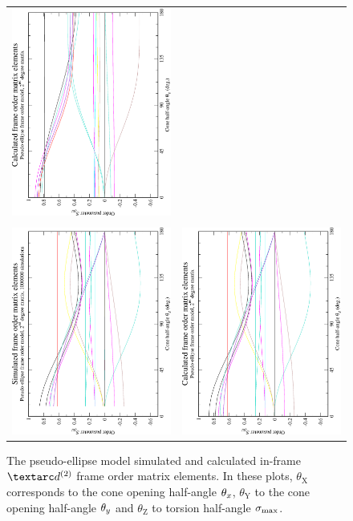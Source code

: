 \begin{figure}
\begin{tabular}{@{}cc@{}}
    \includegraphics[width=.35\textwidth,angle=270]{images/frame_order_matrix/Sijkl_pseudo-ellipse_in_frame_theta_y_calc.eps} \\
    \\[-5pt]
    \includegraphics[width=.35\textwidth,angle=270]{images/frame_order_matrix/Sijkl_pseudo-ellipse_in_frame_theta_z_ens1000000.eps} &
    \includegraphics[width=.35\textwidth,angle=270]{images/frame_order_matrix/Sijkl_pseudo-ellipse_in_frame_theta_z_calc.eps} \\
  \end{tabular}
  \caption[Pseudo-ellipse simulated and calculated in-frame $\FOtwo$ elements.]{
    The pseudo-ellipse model simulated and calculated in-frame $\FOtwo$ frame order matrix elements.
    In these plots, $\theta_\textrm{X}$ corresponds to the cone opening half-angle $\theta_x$, $\theta_\textrm{Y}$ to the cone opening half-angle $\theta_y$ and $\theta_\textrm{Z}$ to torsion half-angle $\sigma_\textrm{max}$.
}
\end{figure}
